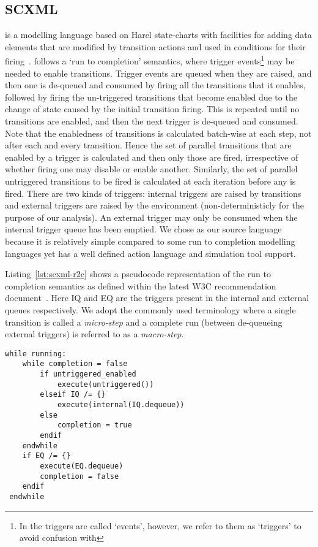 
\subsection{SCXML}
\label{sec:scxml}

\SCXML is a modelling language based on Harel state-charts with facilities for adding data elements that are modified by transition actions and used in conditions for their firing~\cite{scxmlwebsite}. 
\SCXML follows a `run to completion' semantics, where trigger events\footnote{In \SCXML the triggers are called `events', however, we refer to them as `triggers' to avoid confusion with \EventB} may be needed to enable transitions.
Trigger events are queued when they are raised, and then one is de-queued and consumed by firing all the transitions that it enables, followed by firing the un-triggered transitions that become enabled due to the change of state caused by the initial transition firing.
This is repeated until no transitions are enabled, and then the next trigger is de-queued and consumed.
Note that the enabledness of transitions is calculated batch-wise at each step, not after each and every transition.
Hence the set of parallel transitions that are enabled by a trigger is calculated and then only those are fired, irrespective of whether firing one may disable or enable another.
Similarly, the set of parallel untriggered transitions to be fired is calculated at each iteration before any is fired.
There are two kinds of triggers: internal triggers are raised by transitions and external triggers are raised by the environment (non-deterministicly for the purpose of our analysis). 
An external trigger may only be consumed when the internal trigger queue has been emptied.
We chose \SCXML as our source language because it is relatively simple compared to some run to completion modelling languages yet has a well defined action language and simulation tool support.

Listing~\ref{lst:scxml-r2c} shows a pseudocode representation of the run to completion semantics as defined within the latest W3C recommendation document~\cite{scxmlwebsite}. Here IQ and EQ are the triggers present in the internal and external queues respectively. We adopt the commonly used terminology where a single transition is called a \emph{micro-step} and a complete run (between de-queueing external triggers) is referred to as a \emph{macro-step}.

 \begin{lstlisting}[caption=Pseudocode for 'run to completion',label={lst:scxml-r2c}, frame=single]
 while running:
 	while completion = false
 		if untriggered_enabled
 			execute(untriggered())
 		elseif IQ /= {}
 			execute(internal(IQ.dequeue)) 
 		else
 			completion = true
 		endif
 	endwhile
 	if EQ /= {}
 		execute(EQ.dequeue) 
 		completion = false
 	endif
 endwhile 
 \end{lstlisting}

